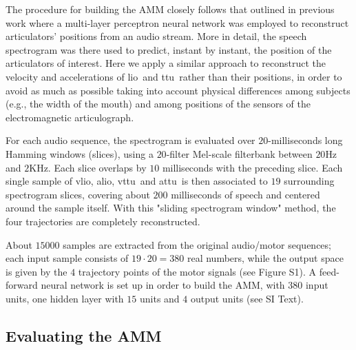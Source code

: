 \documentclass{pnastwo}
\newcommand{\lio}{\textsf{lio}}
\newcommand{\ttu}{\textsf{ttu}}
\newcommand{\vlio}{\textsf{vlio}}
\newcommand{\vttu}{\textsf{vttu}}
\newcommand{\alio}{\textsf{alio}}
\newcommand{\attu}{\textsf{attu}}
\begin{document}
\begin{article}
The procedure for building the AMM closely follows that outlined in previous
work \cite{papcun,richmond,richmond2007} where a multi-layer perceptron
neural network was employed to reconstruct articulators' positions from an
audio stream. More in detail, the speech spectrogram was there used to predict,
instant by instant, the position of the articulators of interest. Here we apply
a similar approach to reconstruct the velocity and accelerations of \lio\ and \ttu\ 
rather than their positions, in order to avoid as much as possible taking into account
physical differences among subjects (e.g., the width of the mouth) and among
positions of the sensors of the electromagnetic articulograph.

For each audio sequence, the spectrogram is evaluated
over $20$-milliseconds long Hamming windows (slices), using a $20$-filter
Mel-scale filterbank between $20$Hz and $2$KHz. Each slice overlaps by $10$ milliseconds with
the preceding slice. Each single sample of \vlio, \alio, \vttu\ and \attu\ is
then associated to $19$ surrounding spectrogram slices, covering
about $200$ milliseconds of speech and centered around the sample itself. With this
"sliding spectrogram window" method, the four trajectories are completely reconstructed.


About $15000$ samples are extracted from the original audio/motor sequences; 
each input sample consists of $19\cdot 20 = 380$ real
numbers, while the output space is given by the $4$ trajectory points of
the motor signals (see Figure S1).
A feed-forward neural network is set up in order to
build the AMM, with $380$ input units, one hidden layer with $15$ units and
$4$ output units (see SI Text).


\subsection{Evaluating the AMM}
\label{subsec:amm_results}


\end{article}
\end{document}
